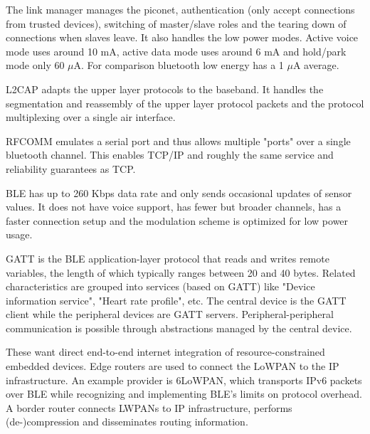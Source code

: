 \begin{mytitle} The link manager manages the piconet, authentication (only accept connections from trusted devices), switching of master/slave roles and the tearing down of connections when slaves leave. It also handles the low power modes. Active voice mode uses around 10 mA, active data mode uses around 6 mA and hold/park mode only 60 $\mu$A. For comparison bluetooth low energy has a 1 $\mu$A average.
\end{mytitle}
\begin{mytitle} L2CAP adapts the upper layer protocols to the baseband. It handles the segmentation and reassembly of the upper layer protocol packets and the protocol multiplexing over a single air interface.
\end{mytitle}
\begin{mytitle} RFCOMM emulates a serial port and thus allows multiple "ports" over a single bluetooth channel. This enables TCP/IP and roughly the same service and reliability guarantees as TCP.
\end{mytitle}
\begin{mytitle} BLE has up to 260 Kbps data rate and only sends occasional updates of sensor values. It does not have voice support, has fewer but broader channels, has a faster connection setup and the modulation scheme is optimized for low power usage.
\end{mytitle}
\begin{mytitle} GATT is the BLE application-layer protocol that reads and writes remote variables, the length of which typically ranges between 20 and 40 bytes. Related characteristics are grouped into services (based on GATT) like "Device information service", "Heart rate profile", etc. The central device is the GATT client while the peripheral devices are GATT servers. Peripheral-peripheral communication is possible through abstractions managed by the central device.
\end{mytitle}
\begin{mytitle} These want direct end-to-end internet integration of resource-constrained embedded devices. Edge routers are used to connect the LoWPAN to the IP infrastructure. An example provider is 6LoWPAN, which transports IPv6 packets over BLE while recognizing and implementing BLE's limits on protocol overhead. A border router connects LWPANs to IP infrastructure, performs (de-)compression and disseminates routing information.
\end{mytitle}

